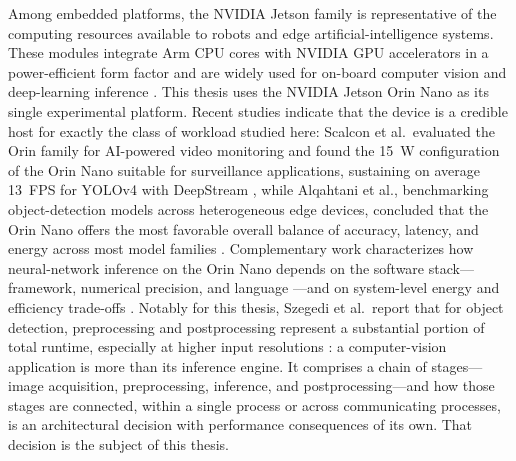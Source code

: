 Among embedded platforms, the NVIDIA Jetson family is representative of the
computing resources available to robots and edge artificial-intelligence
systems. These modules integrate Arm CPU cores with NVIDIA GPU accelerators
in a power-efficient form factor and are widely used for on-board computer
vision and deep-learning inference \cite{scalcon2024}. This thesis uses the
NVIDIA Jetson Orin Nano as its single experimental platform. Recent studies
indicate that the device is a credible host for exactly the class of
workload studied here: Scalcon et al.\ evaluated the Orin family for
AI-powered video monitoring and found the 15~W configuration of the Orin
Nano suitable for surveillance applications, sustaining on average 13~FPS
for YOLOv4 with DeepStream \cite{scalcon2024}, while Alqahtani et al.,
benchmarking object-detection models across heterogeneous edge devices,
concluded that the Orin Nano offers the most favorable overall balance
of accuracy, latency, and energy across most model families
\cite{alqahtani2026}.
Complementary work characterizes how neural-network inference on the Orin
Nano depends on the software stack---framework, numerical precision, and
language \cite{szegedi2026}---and on system-level energy and efficiency
trade-offs \cite{zequn2026}. Notably for this thesis, Szegedi et al.\
report that for object detection, preprocessing and postprocessing
represent a substantial portion of total runtime, especially at higher
input resolutions \cite{szegedi2026}: a computer-vision application is more
than its inference engine. It comprises a chain of stages---image
acquisition, preprocessing, inference, and postprocessing---and how those
stages are connected, within a single process or across communicating
processes, is an architectural decision with performance consequences of
its own. That decision is the subject of this thesis.

